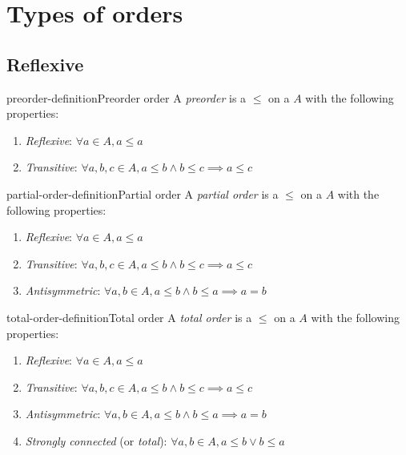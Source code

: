 \documentclass[preview]{standalone}
\begin{document}
\genpage

\section{Types of orders}

\subsection{Reflexive}

\begin{snippetdefinition}{preorder-definition}{Preorder order}
    A \textit{preorder} is a \homrelation \(\leq\) on a \set \(A\)
    with the following properties:
    \begin{enumerate}
        \item \textit{Reflexive}: \(\forall a \in A, a \leq a\)
        \item \textit{Transitive}: \(\forall a,b,c \in A, a \leq b \land b \leq c \implies a \leq c\)
    \end{enumerate}
\end{snippetdefinition}

\begin{snippetdefinition}{partial-order-definition}{Partial order}
    A \textit{partial order} is a \homrelation \(\leq\) on a \set \(A\)
    with the following properties:
    \begin{enumerate}
        \item \textit{Reflexive}: \(\forall a \in A, a \leq a\)
        \item \textit{Transitive}: \(\forall a,b,c \in A, a \leq b \land b \leq c \implies a \leq c\)
        \item \textit{Antisymmetric}: \(\forall a,b \in A, a \leq b \land b \leq a \implies a=b\)
    \end{enumerate}
\end{snippetdefinition}

\begin{snippetdefinition}{total-order-definition}{Total order}
    A \textit{total order} is a \homrelation \(\leq\) on a \set \(A\)
    with the following properties:
    \begin{enumerate}
        \item \textit{Reflexive}: \(\forall a \in A, a \leq a\)
        \item \textit{Transitive}: \(\forall a,b,c \in A, a \leq b \land b \leq c \implies a \leq c\)
        \item \textit{Antisymmetric}: \(\forall a,b \in A, a \leq b \land b \leq a \implies a=b\)
        \item \textit{Strongly connected} (or \textit{total}): \(\forall a,b\in A, a \leq b \lor b\leq a\)
    \end{enumerate}
\end{snippetdefinition}
\end{document}
